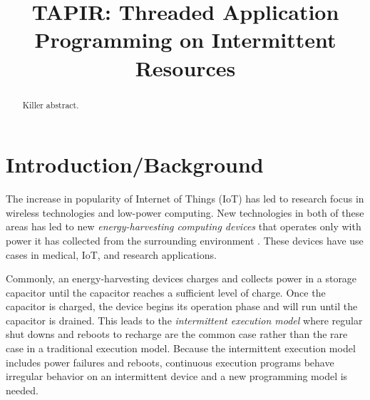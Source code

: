 \documentclass[11pt]{sensys-proc}
\title{TAPIR: Threaded Application Programming on Intermittent Resources}
\begin{document}
\maketitle

\begin{abstract}
Killer abstract.
\end{abstract}


\section{Introduction/Background}
  \label{sec:intro}

The increase in popularity of Internet of Things (IoT) has led to research focus in wireless technologies and low-power computing.
New technologies in both of these areas has led to new
\textit{energy-harvesting computing devices} that operates only with power it has
collected from the surrounding environment \cite{Chain}. These devices have use cases in medical, IoT, and research applications.

Commonly, an energy-harvesting devices charges and collects power in a storage capacitor until the capacitor reaches a sufficient level of charge.
Once the capacitor is charged, the device begins its operation phase and will run until the capacitor is drained.
This leads to the \textit{intermittent execution model} where regular shut downs and reboots to recharge are the common case rather than the rare case in
a traditional execution model. Because the intermittent execution model includes power failures and reboots, continuous execution programs behave
irregular behavior on an intermittent device and a new programming model is needed.
\end{document}
